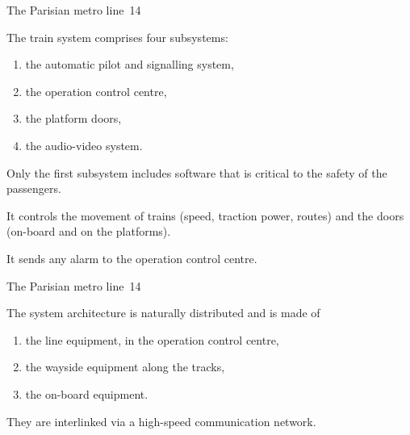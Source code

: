 \documentclass[compress,dvips,xcolor={dvipsnames},t]{beamer}
\begin{document}
%
\begin{frame}{The Parisian metro line~14}

  The train system comprises four subsystems:
  \begin{enumerate}
    \item the automatic pilot and signalling system,

    \item the operation control centre,

    \item the platform doors,

    \item the audio-video system.
  \end{enumerate}

  \bigskip

  Only the first  subsystem includes software that is  critical to the
  safety of the passengers.

  \bigskip

  It controls the movement of trains (speed, traction power, routes)
  and the doors (on\hyp{}board and on the platforms).

  \bigskip

  It sends any alarm to the operation control centre.

\end{frame}

%
\begin{frame}{The Parisian metro line~14}

  The system architecture is naturally distributed and is made of
  \begin{enumerate}

    \item the line equipment, in the operation control centre,

    \item the wayside equipment along the tracks,

    \item the on\hyp{}board equipment.

  \end{enumerate}

  \bigskip

  They are interlinked via a high\hyp{}speed communication network.

\end{frame}
\end{document}
